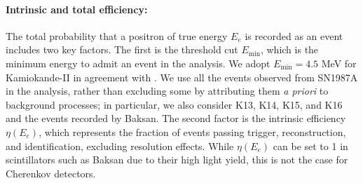 \documentclass[a4paper,11pt]{article}
\begin{document}

\paragraph*{Intrinsic and total efficiency:}
The total probability that a positron of true energy \(E_e\) is recorded as an event includes two key factors. The first is the threshold cut \(E_{\min}\), which is the minimum energy to admit an event in the analysis.  We adopt \(E_\min = 4.5\) MeV for Kamiokande-II in agreement with \cite{Vissani:2014doa}. We use all the events observed from SN1987A in the analysis, rather than excluding some by attributing them \emph{a priori} to background processes; in particular, we also consider K13, K14, K15, and K16 and the events recorded by Baksan.
 The second factor is the intrinsic efficiency \(\eta(E_e)\), which represents the fraction of events passing trigger, reconstruction, and identification, excluding resolution effects. While \(\eta(E_e)\) can be set to 1 in scintillators such as Baksan due to their high light yield, this is not the case for Cherenkov detectors. 
 
\end{document}
